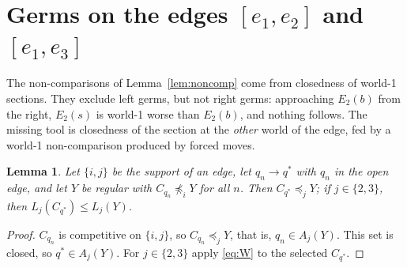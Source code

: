 \documentclass[11pt]{article}
\newtheorem{lemma}[theorem]{Lemma}
\theoremstyle{definition}\newtheorem{definition}[theorem]{Definition}
\theoremstyle{remark}\newtheorem{remark}[theorem]{Remark}
\begin{document}
\section{Germs on the edges \texorpdfstring{$[e_1,e_2]$}{[e1,e2]} and
\texorpdfstring{$[e_1,e_3]$}{[e1,e3]}}\label{sec:germs}

The non-comparisons of Lemma~\ref{lem:noncomp} come from closedness of
world-1 sections. They exclude left germs, but not right germs: approaching
$E_2(b)$ from the right, $E_2(s)$ is world-1 worse than $E_2(b)$, and nothing
follows. The missing tool is closedness of the section at the \emph{other}
world of the edge, fed by a world-1 non-comparison produced by forced moves.

\begin{lemma}\label{lem:otherworld}
Let $\{i,j\}$ be the support of an edge, let $q_n\to q^*$ with $q_n$ in the
open edge, and let $Y$ be regular with $C_{q_n}\not\preceq_iY$ for all $n$.
Then $C_{q^*}\preceq_jY$; if $j\in\{2,3\}$, then $L_j(C_{q^*})\le L_j(Y)$.
\end{lemma}
\begin{proof}
$C_{q_n}$ is competitive on $\{i,j\}$, so $C_{q_n}\preceq_jY$, that is,
$q_n\in A_j(Y)$. This set is closed, so $q^*\in A_j(Y)$. For $j\in\{2,3\}$
apply \eqref{eq:W} to the selected $C_{q^*}$.
\end{proof}
\end{document}
